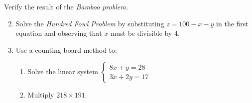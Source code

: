   \clearpage
  
\begin{exercisessec}{}{}
\exstart Verify the result of the \emph{Bamboo problem.}

\begin{enumerate}\setcounter{enumi}{1}
  \item Solve the \emph{Hundred Fowl Problem} by substituting $z=100-x-y$ in the first equation and observing that $x$ must be divisible by 4.
% 

	\item Use a counting board method to:
	\begin{enumerate}
	  \item Solve the linear system $\begin{cases}
	  8x+y=28\\
	  3x+2y=17
	  \end{cases}$
		\item Multiply $218\times 191$.
	\end{enumerate}
	


\end{enumerate}
\end{exercisessec}
